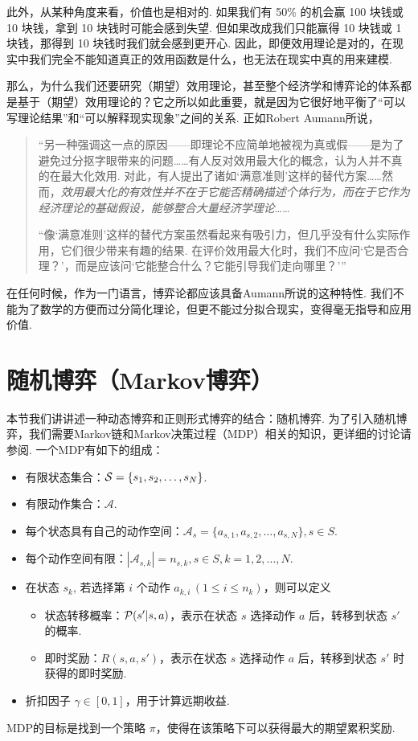 此外，从某种角度来看，价值也是相对的. 如果我们有 50\% 的机会赢 100 块钱或 10 块钱，拿到 10 块钱时可能会感到失望. 但如果改成我们只能赢得 10 块钱或 1 块钱，那得到 10 块钱时我们就会感到更开心. 因此，即便效用理论是对的，在现实中我们完全不能知道真正的效用函数是什么，也无法在现实中真的用来建模.

那么，为什么我们还要研究（期望）效用理论，甚至整个经济学和博弈论的体系都是基于（期望）效用理论的？它之所以如此重要，就是因为它很好地平衡了“可以写理论结果”和“可以解释现实现象”之间的关系. 正如Robert Aumann所说，

\begin{quotation}
    “另一种强调这一点的原因——即理论不应简单地被视为真或假——是为了避免过分抠字眼带来的问题……有人反对效用最大化的概念，认为人并不真的在最大化效用. 对此，有人提出了诸如‘满意准则’这样的替代方案……然而，\textit{效用最大化的有效性并不在于它能否精确描述个体行为，而在于它作为经济理论的基础假设，能够整合大量经济学理论}……

    “像‘满意准则’这样的替代方案虽然看起来有吸引力，但几乎没有什么实际作用，它们很少带来有趣的结果. 在评价效用最大化时，我们不应问‘它是否合理？’，而是应该问‘它能整合什么？它能引导我们走向哪里？’”
\end{quotation}

在任何时候，作为一门语言，博弈论都应该具备Aumann所说的这种特性. 我们不能为了数学的方便而过分简化理论，但更不能过分拟合现实，变得毫无指导和应用价值.

\section{随机博弈（Markov博弈）}\label{sec:stochastic-game}

本节我们讲讲述一种动态博弈和正则形式博弈的结合：随机博弈. 为了引入随机博弈，我们需要Markov链和Markov决策过程（MDP）相关的知识，更详细的讨论请参阅. 一个MDP有如下的组成：
\begin{itemize}
\item 有限状态集合：$\mathcal S=\{s_1,s_2,\dots,s_N\}$.
\item 有限动作集合：$\mathcal A$.
\item 每个状态具有自己的动作空间：$\mathcal A_s = \{a_{s,1},a_{s,2},\dots, a_{s,N}\}, s\in S$.
\item 每个动作空间有限：$|\mathcal A_{s,k}|=n_{s,k}, s\in S, k=1,2,\dots,N$.
\item 在状态 $s_k$, 若选择第 $i$ 个动作 $a_{k,i}\,(1\leq i\leq n_{k})$，则可以定义
\begin{itemize}
        \item 状态转移概率：$\mathcal P(s'|s,a)$，表示在状态 $s$ 选择动作 $a$ 后，转移到状态 $s'$ 的概率. 
        \item 即时奖励：$R(s,a,s')$，表示在状态 $s$ 选择动作 $a$ 后，转移到状态 $s'$ 时获得的即时奖励. 
   \end{itemize}
\item 折扣因子 $\gamma\in[0,1]$，用于计算远期收益.
\end{itemize}
MDP的目标是找到一个策略 $\pi$，使得在该策略下可以获得最大的期望累积奖励. 

